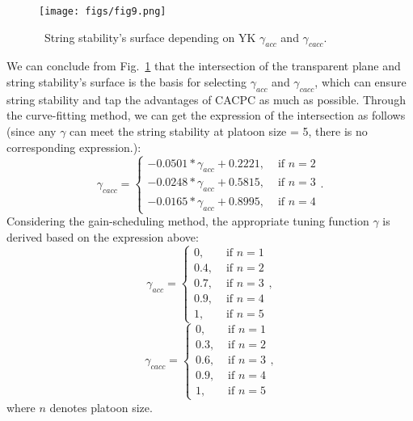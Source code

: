 \documentclass[trsc,nonblindrev]{informs3} %
\begin{document}
\begin{figure}
    \centering
    \texttt{[image: figs/fig9.png]}
    \caption{~String stability's surface depending on YK $\gamma_{acc}$ and $\gamma_{cacc}$.}
    \label{fig9}
\end{figure}
We can conclude from Fig.~\ref{fig9} that the intersection of the transparent plane and string stability's surface is the basis for selecting $\gamma_{acc}$ and $\gamma_{cacc}$, which can ensure string stability and tap the advantages of CACPC as much as possible. Through the curve-fitting method, we can get the expression of the intersection as follows (since any $\gamma$ can meet the string stability at platoon size = 5, there is no corresponding expression.):
\begin{equation}
    \gamma_{c a c c}= \begin{cases}-0.0501 * \gamma_{a c c}+0.2221 ,& \text { if } n=2 \\ -0.0248 * \gamma_{a c c}+0.5815 ,& \text { if } n=3 \\ -0.0165 * \gamma_{a c c}+0.8995 ,& \text { if } n=4\end{cases}.
\end{equation}
Considering the gain-scheduling method, the appropriate tuning function $\gamma$ is derived based on the expression above:
\begin{equation}
    \gamma_{a c c}=\left\{\begin{array}{cc}
        0 ,   & \text { if } n=1 \\
        0.4 , & \text { if } n=2 \\
        0.7 , & \text { if } n=3 \\
        0.9 , & \text { if } n=4 \\
        1 ,   & \text { if } n=5
    \end{array}\right.,
\end{equation}
\begin{equation}
    \gamma_{c a c c}=\left\{\begin{array}{cc}
        0 ,   & \text { if } n=1 \\
        0.3 , & \text { if } n=2 \\
        0.6 , & \text { if } n=3 \\
        0.9 , & \text { if } n=4 \\
        1 ,   & \text { if } n=5
    \end{array}\right.,
\end{equation}
where $n$ denotes platoon size.
\end{document}
